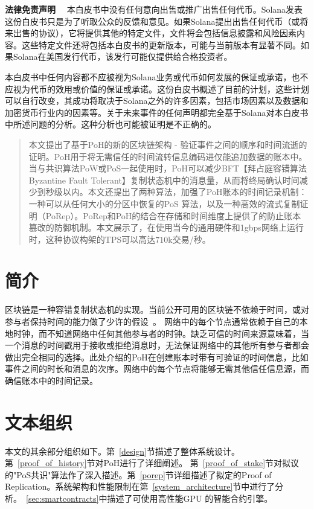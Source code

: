 \documentclass[12pt, uft8]{ctexart}
\begin{document}
\maketitle

\textbf{\footnotesize 法律免责声明}\scriptsize
~~本白皮书中没有任何意向出售或推广出售任何代币。Solana发表这份白皮书只是为了听取公众的反馈和意见。如果Solana提出出售任何代币（或将来出售的协议），它将提供其他的特定文件，文件将会包括信息披露和风险因素内容。这些特定文件还将包括本白皮书的更新版本，可能与当前版本有显著不同。如果Solana在美国发行代币，该发行可能仅提供给合格投资者。

本白皮书中任何内容都不应被视为Solana业务或代币如何发展的保证或承诺，也不应视为代币的效用或价值的保证或承诺。这份白皮书概述了目前的计划，这些计划可以自行改变，其成功将取决于Solana之外的许多因素，包括市场因素以及数据和加密货币行业内的因素等。关于未来事件的任何声明都完全基于Solana对本白皮书中所述问题的分析。这种分析也可能被证明是不正确的。

\begin{abstract}
本文提出了基于PoH的新的区块链架构 - 验证事件之间的顺序和时间流逝的证明。PoH用于将无需信任的时间流转信息编码进仅能追加数据的账本中。当与共识算法PoW或PoS一起使用时，PoH可以减少BFT【拜占庭容错算法Byzantine Fault Tolerant】复制状态机中的消息量，从而将终局确认时间减少到秒级以内。本文还提出了两种算法，加强了PoH账本的时间记录机制： 一种可以从任何大小的分区中恢复的PoS 算法，以及一种高效的流式复制证明（PoRep）。PoRep和PoH的结合在存储和时间维度上提供了的防止账本篡改的防御机制。本文展示了，在使用当今的通用硬件和1gbps网络上运行时，这种协议构架的TPS可以高达$710$k交易/秒。



\end{abstract}


\section{简介}\normalsize
区块链是一种容错复制状态机的实现。当前公开可用的区块链不依赖于时间，或对参与者保持时间的能力做了少许的假设~\cite{tendermint,hashgraph}。 网络中的每个节点通常依赖于自己的本地时钟，而不知道网络中任何其他参与者的时钟。缺乏可信的时间来源意味着，当一个消息的时间戳用于接收或拒绝消息时，无法保证网络中的其他所有参与者都会做出完全相同的选择。此处介绍的PoH在创建账本时带有可验证的时间信息，比如事件之间的时长和消息的次序。网络中的每个节点将能够无需其他信任信息源，而确信账本中的时间记录。

\section{文本组织}
本文的其余部分组织如下。第~\ref{design}节描述了整体系统设计。第~\ref{proof_of_history}节对PoH进行了详细阐述。 第~\ref{proof_of_stake}节对拟议的"PoS共识"算法作了深入描述。第~\ref{porep}节详细描述了拟定的Proof of Replication。系统架构和性能限制在第~\ref{system_architecture}节中进行了分析。~\ref{sec:smartcontracts}中描述了可使用高性能GPU 的智能合约引擎。
\end{document}

